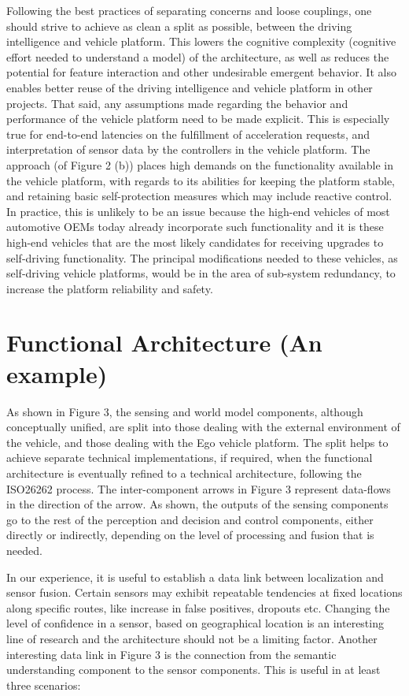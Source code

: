 Following the best practices of separating concerns and loose couplings, one should strive to  achieve as clean a split as possible, between the driving intelligence and vehicle platform. This lowers the cognitive complexity (cognitive effort needed to understand a model) of the architecture, as well
as reduces the potential for feature interaction and other undesirable emergent behavior. It also enables better reuse of the driving intelligence and vehicle platform in other projects. That said, any assumptions made regarding the behavior and performance of the vehicle platform need to
be made explicit. This is especially true for end-to-end latencies on the fulfillment of acceleration requests, and interpretation of sensor data by the controllers in the vehicle platform. The approach (of Figure 2 (b)) places high demands
on the functionality available in the vehicle platform, with regards to its abilities for keeping the platform stable, and retaining basic self-protection measures which may include reactive control. In practice, this is unlikely to be an issue because the high-end vehicles of most automotive OEMs today already incorporate such functionality and it is these high-end vehicles that are the most likely candidates for receiving upgrades to self-driving functionality. The principal modifications needed to these vehicles, as self-driving vehicle platforms, would be in the area of sub-system redundancy,
to increase the platform reliability and safety.


\section{Functional Architecture (An example)}

As shown in Figure 3, the sensing and world model components, although conceptually unified, are split into those dealing with the external environment of the vehicle, and
those dealing with the Ego vehicle platform. The split helps to achieve separate technical implementations, if required, when the functional architecture is eventually refined to a
technical architecture, following the ISO26262 process. The inter-component arrows in Figure 3 represent data-flows in
the direction of the arrow. As shown, the outputs of the sensing components go to the rest of the perception and decision and control components, either directly or indirectly, depending on the level of processing and fusion that is needed.

In our experience, it is useful to establish a data link between localization and sensor fusion. Certain sensors may exhibit repeatable tendencies at fixed locations along specific routes, like increase in false positives, dropouts etc. Changing the level of confidence in a sensor, based on geographical
location is an interesting line of research and the architecture should not be a limiting factor.
Another interesting data link in Figure 3 is the connection from the semantic understanding component to the sensor components. This is useful in at least three scenarios:

